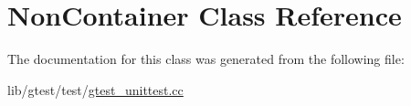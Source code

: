 \hypertarget{class_non_container}{\section{Non\-Container Class Reference}
\label{class_non_container}
}


The documentation for this class was generated from the following file\-:\begin{DoxyCompactItemize}
\item 
lib/gtest/test/\hyperlink{gtest__unittest_8cc}{gtest\-\_\-unittest.\-cc}\end{DoxyCompactItemize}
